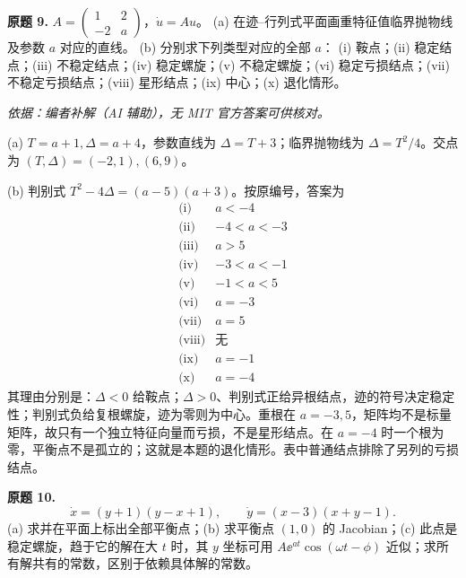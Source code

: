 \begin{exercise}\label{cw:final-9}\textbf{原题 9.} $A=\begin{pmatrix}1&2\\-2&a\end{pmatrix}$，$\dot u=Au$。
(a) 在迹--行列式平面画重特征值临界抛物线及参数 $a$ 对应的直线。
(b) 分别求下列类型对应的全部 $a$：
(i) 鞍点；(ii) 稳定结点；(iii) 不稳定结点；(iv) 稳定螺旋；(v) 不稳定螺旋；(vi) 稳定亏损结点；(vii) 不稳定亏损结点；(viii) 星形结点；(ix) 中心；(x) 退化情形。
\end{exercise}
\begin{solution}
\textit{依据：编者补解（AI 辅助），无 MIT 官方答案可供核对。}\par
(a) $T=a+1,\Delta=a+4$，参数直线为 $\Delta=T+3$；临界抛物线为 $\Delta=T^2/4$。交点为 $(T,\Delta)=(-2,1),(6,9)$。
\begin{center}\end{center}
(b) 判别式 $T^2-4\Delta=(a-5)(a+3)$。按原编号，答案为
\[
\begin{array}{c|l}
\text{(i)}&a<-4\\
\text{(ii)}&-4<a<-3\\
\text{(iii)}&a>5\\
\text{(iv)}&-3<a<-1\\
\text{(v)}&-1<a<5\\
\text{(vi)}&a=-3\\
\text{(vii)}&a=5\\
\text{(viii)}&\text{无}\\
\text{(ix)}&a=-1\\
\text{(x)}&a=-4
\end{array}
\]
其理由分别是：$\Delta<0$ 给鞍点；$\Delta>0$、判别式正给异根结点，迹的符号决定稳定性；判别式负给复根螺旋，迹为零则为中心。重根在 $a=-3,5$，矩阵均不是标量矩阵，故只有一个独立特征向量而亏损，不是星形结点。在 $a=-4$ 时一个根为零，平衡点不是孤立的；这就是本题的退化情形。表中普通结点排除了另列的亏损结点。
\end{solution}
\begin{exercise}\label{cw:final-10}\textbf{原题 10.}
\[\dot x=(y+1)(y-x+1),\qquad \dot y=(x-3)(x+y-1).\]
(a) 求并在平面上标出全部平衡点；(b) 求平衡点 $(1,0)$ 的 Jacobian；(c) 此点是稳定螺旋，趋于它的解在大 $t$ 时，其 $y$ 坐标可用 $A\ee^{at}\cos(\omega t-\phi)$ 近似；求所有解共有的常数，区别于依赖具体解的常数。
\end{exercise}
